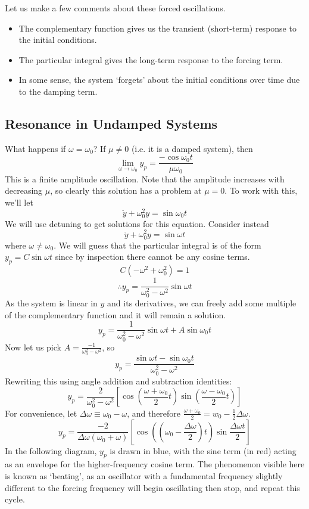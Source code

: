 \documentclass{article}
\begin{document}
	\noindent Let us make a few comments about these forced oscillations.
	\begin{itemize}
		\item The complementary function gives us the transient (short-term) response to the initial conditions.
		\item The particular integral gives the long-term response to the forcing term.
		\item In some sense, the system `forgets' about the initial conditions over time due to the damping term.
	\end{itemize}
	
	\subsection{Resonance in Undamped Systems}
	What happens if $\omega = \omega_0$? If $\mu \neq 0$ (i.e. it is a damped system), then
	\[ \lim_{\omega \to \omega_0} y_p = \frac{-\cos\omega_0 t}{\mu\omega_0} \]
	This is a finite amplitude oscillation. Note that the amplitude increases with decreasing $\mu$, so clearly this solution has a problem at $\mu = 0$. To work with this, we'll let
	\[ \ddot y + \omega_0^2 y = \sin\omega_0 t \]
	We will use detuning to get solutions for this equation. Consider instead
	\[ \ddot y + \omega_0^2 y = \sin\omega t \]
	where $\omega \neq \omega_0$. We will guess that the particular integral is of the form $y_p = C\sin\omega t$ since by inspection there cannot be any cosine terms.
	\[ C(-\omega^2 + \omega_0^2) = 1 \]
	\[ \therefore y_p = \frac{1}{\omega_0^2 - \omega^2}\sin\omega t \]
	As the system is linear in $y$ and its derivatives, we can freely add some multiple of the complementary function and it will remain a solution.
	\[ y_p = \frac{1}{\omega_0^2 - \omega^2}\sin\omega t + A \sin\omega_0 t \]
	Now let us pick $A = \frac{-1}{\omega_0^2 - \omega^2}$, so
	\[ y_p = \frac{\sin \omega t - \sin \omega_0 t}{\omega_0^2 - \omega^2} \]
	Rewriting this using angle addition and subtraction identities:
	\[ y_p = \frac{2}{\omega_0^2 - \omega^2}\left[ \cos\left( \frac{\omega + \omega_0}{2}t \right) \sin\left( \frac{\omega - \omega_0}{2}t \right) \right] \]
	For convenience, let $\Delta\omega \equiv \omega_0 - \omega$, and therefore $\frac{\omega + \omega_0}{2} = w_0 - \frac{1}{2}\Delta\omega$.
	\[ y_p = \frac{-2}{\Delta\omega(\omega_0 + \omega)}\left[ \cos\left( \left(\omega_0 - \frac{\Delta\omega}{2}\right)t \right) \sin\frac{\Delta\omega t}{2} \right] \]
	In the following diagram, $y_p$ is drawn in blue, with the sine term (in red) acting as an envelope for the higher-frequency cosine term. The phenomenon visible here is known as `beating', as an oscillator with a fundamental frequency slightly different to the forcing frequency will begin oscillating then stop, and repeat this cycle.\medskip
\end{document}
